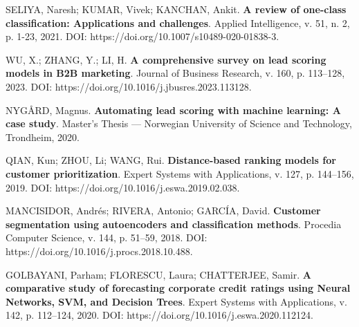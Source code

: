 \documentclass[
        oneside,      %
        english,			
        brazil			 
        ]{abntbibufjf}
\begin{document}
\begin{thebibliography}{99}






 SELIYA, Naresh; KUMAR, Vivek; KANCHAN, Ankit. 
\textbf{A review of one-class classification: Applications and challenges}. 
Applied Intelligence, v. 51, n. 2, p. 1-23, 2021. 
DOI: https://doi.org/10.1007/s10489-020-01838-3.

 WU, X.; ZHANG, Y.; LI, H. 
\textbf{A comprehensive survey on lead scoring models in B2B marketing}. 
Journal of Business Research, v. 160, p. 113–128, 2023. 
DOI: https://doi.org/10.1016/j.jbusres.2023.113128.

 NYGÅRD, Magnus. 
\textbf{Automating lead scoring with machine learning: A case study}. 
Master’s Thesis — Norwegian University of Science and Technology, Trondheim, 2020. 

 QIAN, Kun; ZHOU, Li; WANG, Rui. 
\textbf{Distance-based ranking models for customer prioritization}. 
Expert Systems with Applications, v. 127, p. 144–156, 2019. 
DOI: https://doi.org/10.1016/j.eswa.2019.02.038.

 MANCISIDOR, Andrés; RIVERA, Antonio; GARCÍA, David. 
\textbf{Customer segmentation using autoencoders and classification methods}. 
Procedia Computer Science, v. 144, p. 51–59, 2018. 
DOI: https://doi.org/10.1016/j.procs.2018.10.488.

 GOLBAYANI, Parham; FLORESCU, Laura; CHATTERJEE, Samir. 
\textbf{A comparative study of forecasting corporate credit ratings using Neural Networks, SVM, and Decision Trees}. 
Expert Systems with Applications, v. 142, p. 112–124, 2020. 
DOI: https://doi.org/10.1016/j.eswa.2020.112124.


\end{thebibliography}
\end{document}
